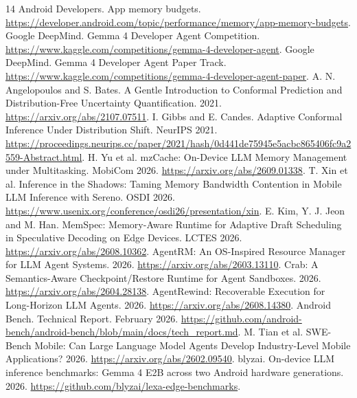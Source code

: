 \documentclass[10pt,twocolumn]{article}
\begin{document}
\begin{thebibliography}{14}
 Android Developers. App memory budgets.
\url{https://developer.android.com/topic/performance/memory/app-memory-budgets}.
 Google DeepMind. Gemma 4 Developer Agent Competition.
\url{https://www.kaggle.com/competitions/gemma-4-developer-agent}.
 Google DeepMind. Gemma 4 Developer Agent Paper Track.
\url{https://www.kaggle.com/competitions/gemma-4-developer-agent-paper}.
 A. N. Angelopoulos and S. Bates. A Gentle Introduction to
Conformal Prediction and Distribution-Free Uncertainty Quantification. 2021.
\url{https://arxiv.org/abs/2107.07511}.
 I. Gibbs and E. Candes. Adaptive Conformal Inference Under
Distribution Shift. NeurIPS 2021.
\url{https://proceedings.neurips.cc/paper/2021/hash/0d441de75945e5acbc865406fc9a2559-Abstract.html}.
 H. Yu et al. mzCache: On-Device LLM Memory Management under
Multitasking. MobiCom 2026. \url{https://arxiv.org/abs/2609.01338}.
 T. Xin et al. Inference in the Shadows: Taming Memory Bandwidth
Contention in Mobile LLM Inference with Sereno. OSDI 2026.
\url{https://www.usenix.org/conference/osdi26/presentation/xin}.
 E. Kim, Y. J. Jeon and M. Han. MemSpec: Memory-Aware Runtime for
Adaptive Draft Scheduling in Speculative Decoding on Edge Devices. LCTES 2026.
\url{https://arxiv.org/abs/2608.10362}.
 AgentRM: An OS-Inspired Resource Manager for LLM Agent Systems.
2026. \url{https://arxiv.org/abs/2603.13110}.
 Crab: A Semantics-Aware Checkpoint/Restore Runtime for Agent Sandboxes.
2026. \url{https://arxiv.org/abs/2604.28138}.
 AgentRewind: Recoverable Execution for Long-Horizon LLM Agents.
2026. \url{https://arxiv.org/abs/2608.14380}.
 Android Bench. Technical Report. February 2026.
\url{https://github.com/android-bench/android-bench/blob/main/docs/tech_report.md}.
 M. Tian et al. SWE-Bench Mobile: Can Large Language Model
Agents Develop Industry-Level Mobile Applications? 2026.
\url{https://arxiv.org/abs/2602.09540}.
 blyzai. On-device LLM inference benchmarks: Gemma 4 E2B across
two Android hardware generations. 2026.
\url{https://github.com/blyzai/lexa-edge-benchmarks}.
\end{thebibliography}
\end{document}
